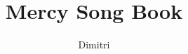 \usepackage[chorded,noscripture]{songs}
\usepackage{lyluatex}

\usepackage{array}
\usepackage{graphicx}
\usepackage[table]{xcolor}

\indexesoff

\renewcommand{\everychorus}{\textnote{Chorus:}}

\renewcommand{\lyricfont}{\sffamily\small}
\renewcommand{\printchord}[1]{\rmfamily\bf#1}


\title{Mercy Song Book}
\author{Dimitri}
